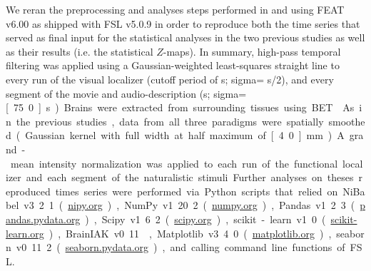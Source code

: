 %
We reran the preprocessing and analyses steps performed in
\citet{sengupta2016extension} and \citet{haeusler2022processing} using FEAT
v6.00 \citep[FMRI Expert Analysis Tool;][]{woolrich2001autocorr} as shipped with
FSL v5.0.9 \citep[\href{https://www.fmrib.ox.ac.uk/fsl}{FMRIB's Software
Library;}][]{smith2004fsl} in order to reproduce both the time series that
served as final input for the statistical analyses in the two previous studies
as well as their results (i.e. the statistical $Z$-maps).
In summary, high-pass temporal filtering was applied using a Gaussian-weighted
least-squares straight line to every run of the visual localizer (cutoff period
of \unit[100]{s}; sigma= \unit[100]{s}/2), and every segment of the
movie and audio-description (\unit[150]{s}; sigma=\unit[75.0]{s}).
Brains were extracted from surrounding tissues using BET \citep{smith2002bet}.
As in the previous studies, data from all three paradigms were spatially
smoothed (Gaussian kernel with full width at half maximum of \unit[4.0]{mm}).
A grand-mean intensity normalization was applied to each run of the functional
localizer and each segment of the naturalistic stimuli.

%
Further analyses on theses reproduced times series were performed via Python
scripts that relied on
%
NiBabel v3.2.1 (\href{https://nipy.org}{\url{nipy.org}}),
%
NumPy v1.20.2 (\href{https://numpy.org}{\url{numpy.org}}),
%
Pandas v1.2.3 (\href{https://pandas.pydata.org}{\url{pandas.pydata.org}}),
%
Scipy v1.6.2 (\href{https://scipy.org}{\url{scipy.org}}),
%
scikit-learn v1.0 (\href{https://scikit-learn.org}{\url{scikit-learn.org}}),
%
BrainIAK v0.11
\citep[\href{https://brainiak.org}{\url{brainiak.org}}][]{kumar2020brainiak,
kumar2020brainiaktutorial},
%
Matplotlib v3.4.0 (\href{https://matplotlib.org}{\url{matplotlib.org}}),
%
seaborn v0.11.2 (\href{https://seaborn.pydata.org}{\url{seaborn.pydata.org}}),
%
and calling command line functions of FSL.




